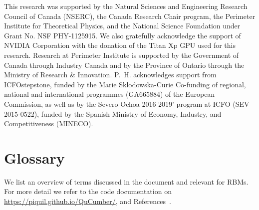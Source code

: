 \documentclass[submission, Phys, hidelinks]{SciPost}
\begin{document}
This research was supported by the Natural Sciences and Engineering
Research Council of Canada (NSERC), the
Canada Research Chair program, the Perimeter Institute
for Theoretical Physics, and the National Science Foundation
under Grant No. NSF PHY-1125915. We also gratefully
acknowledge the support of NVIDIA Corporation with
the donation of the Titan Xp GPU used for this research.
Research at Perimeter Institute is supported by the Government
of Canada through Industry Canada and by the
Province of Ontario through the Ministry of Research \&
Innovation. P.~H. acknowledges support from ICFOstepstone, funded by the Marie Sklodowska-Curie Co-funding of regional, national and international programmes (GA665884) of the European Commission, as well as by the Severo Ochoa 2016-2019' program at ICFO (SEV-2015-0522), funded by the Spanish Ministry of Economy, Industry, and Competitiveness (MINECO).


\appendix
\section{Glossary}
\label{Glossary}

We list an overview of terms discussed in the document and relevant for RBMs. For more detail we refer to the code documentation on \url{https://piquil.github.io/QuCumber/}, and References~\cite{hinton2002training, hinton2012practical}.
\end{document}
